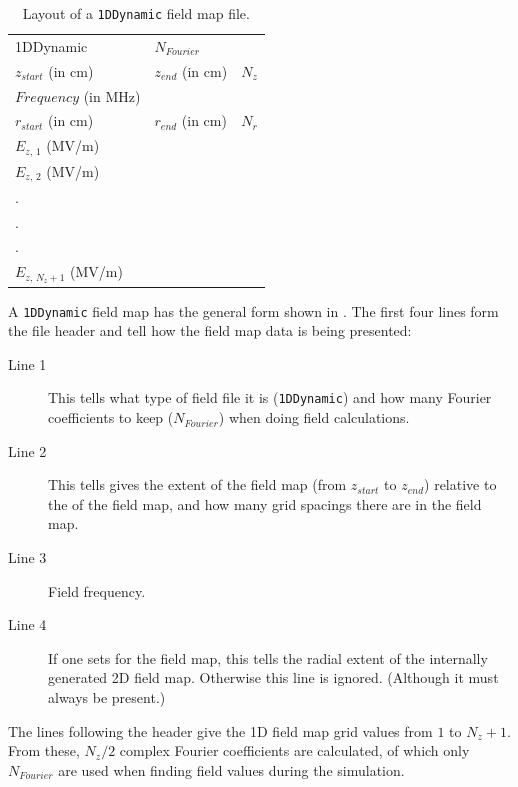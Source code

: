 \begin{table}[ht!]
    \caption{Layout of a \texttt{1DDynamic} field map file.}
    \label{tab:1DDynamic}
    \begin{center}
    \begin{tabular}{lll}
      \hline
      1DDynamic & $N_{Fourier}$ & \\
      $z_{start}$ (in cm) & $z_{end}$ (in cm) & $N_{z}$ \\
      $Frequency$ (in MHz)& & \\
      $r_{start}$ (in cm) & $r_{end}$ (in cm) & $N_{r}$ \\
      $E_{z,\,1}$ (MV/m) & & \\
      $E_{z,\,2}$ (MV/m) & & \\
      . & & \\
      . & & \\
      . & & \\
      $E_{z,\,N_{z} + 1}$ (MV/m) & & \\
      \hline
    \end{tabular}
    \end{center}
\end{table}

A \texttt{1DDynamic} field map has the general form shown in . The first four lines form
the file header and tell \opalt how the field map data is being presented:

\begin{description}
\item[Line 1] This tells \opalt what type of field file it is (\texttt{1DDynamic}) and how many Fourier coefficients to
  keep ($N_{Fourier}$) when doing field calculations.
\item[Line 2] This tells gives the extent of the field map (from $z_{start}$ to $z_{end}$) relative to the  of
  the field map, and how many grid spacings there are in the field map.
\item[Line 3] Field frequency.
\item[Line 4] If one sets  for the field map, this tells \opalt the radial extent of the internally
  generated 2D field map. Otherwise this line is ignored. (Although it must always be present.)
\end{description}

The lines following the header give the 1D field map grid values from $1$ to $N_{z} + 1$. From these, $N_{z}/2$
complex Fourier coefficients are calculated, of which only $N_{Fourier}$ are used when finding field values during the
simulation.

